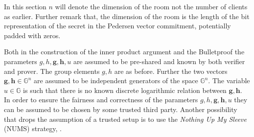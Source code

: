 


In this section $n$ will denote the dimension of the room not the number of clients as earlier. Further remark that, the dimension of the room is the length of the bit representation of the secret in the Pedersen vector commitment, potentially padded with zeros.

Both in the construction of the inner product argument and the Bulletproof the parameters $g,h,\mathbf{g},\mathbf{h},u$ are assumed to be pre-shared and known by both verifier and prover. The group elements $g,h$ are as before. Further the two vectors $\mathbf{g}, \mathbf{h} \in \mathds{G}^n$ are assumed to be independent generators of the space $\mathds{G}^n$. The variable $u\in\mathds{G}$ is such that there is no known discrete logarithmic relation between $\mathbf{g},\mathbf{h}$. In order to ensure the fairness and correctness of the parameters $g,h,\mathbf{g},\mathbf{h},u$ they can be  assumed to be chosen by some trusted third party. Another possibility that drops the assumption of a trusted setup is to use the \textit{Nothing Up My Sleeve} (NUMS) strategy, \cite{ZKRP_Morais}.

